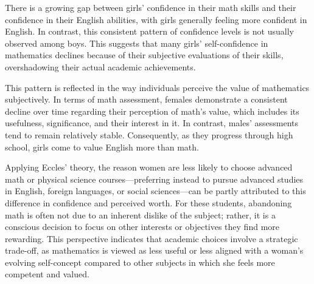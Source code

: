 There is a growing gap between girls' confidence in their math skills and their confidence in their English abilities, with girls generally feeling more confident in English. In contrast, this consistent pattern of confidence levels is not usually observed among boys. This suggests that many girls' self-confidence in mathematics declines because of their subjective evaluations of their skills, overshadowing their actual academic achievements.

This pattern is reflected in the way individuals perceive the value of mathematics subjectively. In terms of math assessment, females demonstrate a consistent decline over time regarding their perception of math's value, which includes its usefulness, significance, and their interest in it. In contrast, males' assessments tend to remain relatively stable. Consequently, as they progress through high school, girls come to value English more than math. 

Applying Eccles' theory, the reason women are less likely to choose advanced math or physical science courses—preferring instead to pursue advanced studies in English, foreign languages, or social sciences—can be partly attributed to this difference in confidence and perceived worth. For these students, abandoning math is often not due to an inherent dislike of the subject; rather, it is a conscious decision to focus on other interests or objectives they find more rewarding. This perspective indicates that academic choices involve a strategic trade-off, as mathematics is viewed as less useful or less aligned with a woman's evolving self-concept compared to other subjects in which she feels more competent and valued.

